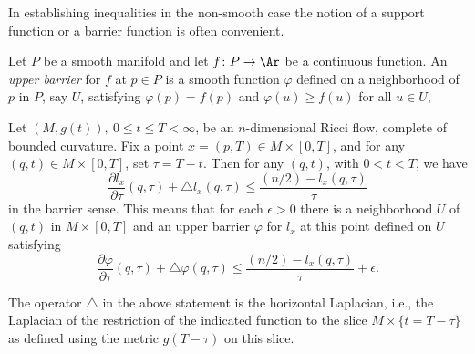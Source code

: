 In establishing inequalities in the non-smooth case the notion of a
support function or a barrier function is often convenient.

\begin{definition}
\label{def:upper-barrier}
Let $P$ be a smooth manifold and let $f\colon P\to \Ar$ be a continuous
function. An {\em upper barrier} for $f$ at $p\in P$ is a
smooth function $\varphi$ defined on a neighborhood of $p$ in $P$, say $U$,
satisfying $\varphi(p)=f(p)$ and $\varphi(u)\ge f(u)$ for all $u\in U$, 
\end{definition}





\begin{proposition}
\label{prop:l-barrier-inequality}
\label{weaksense}
Let $(M,g(t)),\ 0\le t\le T<\infty$, be an $n$-dimensional Ricci
flow,  complete  of bounded curvature. Fix a point $x=(p,T)\in
M\times [0,T]$, and for any $(q,t)\in M\times [0,T]$, set
$\tau=T-t$. Then for any $(q,t)$, with $0<t<T$, we have
$$\frac{\partial l_x}{\partial \tau}(q,\tau) +\triangle l_x(q,\tau)\le
\frac{(n/2)-l_x(q,\tau)}{\tau}$$ in the barrier sense. This means
that
 for each $\epsilon>0$ there is a neighborhood $U$ of $(q,t)$ in
 $M\times [0,T]$
 and an upper barrier $\varphi$ for $l_x$ at this point defined on $U$
satisfying
$$\frac{\partial \varphi}{\partial \tau}(q,\tau)+\triangle \varphi(q,\tau)
\le \frac{(n/2)-l_x(q,\tau)}{\tau}+\epsilon.$$
\end{proposition}

\begin{remark}
\label{rem:horizontal-laplacian-convention}
The operator $\triangle$ in the above statement is the horizontal
Laplacian, i.e., the Laplacian of the restriction of the indicated
function to the slice $M\times\{t=T-\tau\}$ as defined using the
metric $g(T-\tau)$ on this slice.
\end{remark}

